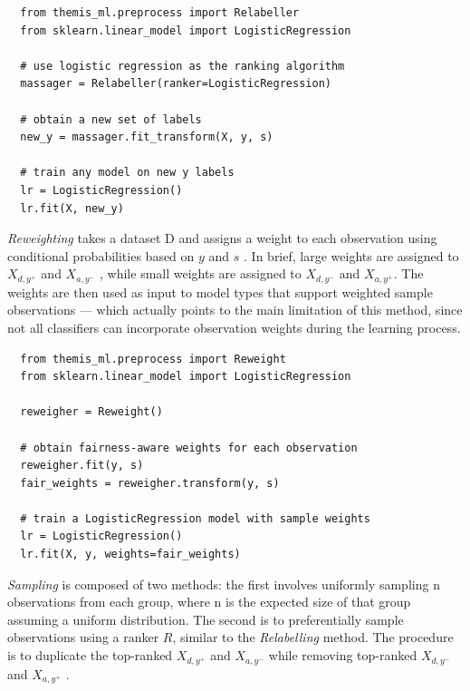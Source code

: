 \documentclass{acm_proc_article-sp}
\begin{document}
\begin{verbatim}
  from themis_ml.preprocess import Relabeller
  from sklearn.linear_model import LogisticRegression

  # use logistic regression as the ranking algorithm
  massager = Relabeller(ranker=LogisticRegression)

  # obtain a new set of labels
  new_y = massager.fit_transform(X, y, s)

  # train any model on new y labels
  lr = LogisticRegression()
  lr.fit(X, new_y)
\end{verbatim}

\emph{Reweighting} takes a dataset D and assigns a weight to each observation
using conditional probabilities based on \(y\) and \(s\) \cite{kamiran2012data}.
In brief, large weights are assigned to \(X_{d, y^{+}}\) and \(X_{a, y^{-}}\) ,
while small weights are assigned to \(X_{d, y^{-}}\) and \(X_{a, y^{+}}\). The
weights are then used as input to model types that support weighted sample
observations --- which actually points to the main limitation of this method,
since not all classifiers can incorporate observation weights during the
learning process.

\begin{verbatim}
  from themis_ml.preprocess import Reweight
  from sklearn.linear_model import LogisticRegression

  reweigher = Reweight()

  # obtain fairness-aware weights for each observation
  reweigher.fit(y, s)
  fair_weights = reweigher.transform(y, s)

  # train a LogisticRegression model with sample weights
  lr = LogisticRegression()
  lr.fit(X, y, weights=fair_weights)
\end{verbatim}

\emph{Sampling} is composed of two methods: the first involves uniformly
sampling n observations from each group, where n is the expected size of that
group assuming a uniform distribution. The second is to preferentially sample
observations using a ranker \(R\), similar to the \emph{Relabelling} method. The
procedure is to duplicate the top-ranked \(X_{d, y^{+}}\) and \(X_{a, y^{-}}\)
while removing top-ranked \(X_{d, y^{-}}\) and \(X_{a, y^{+}}\)
\cite{kamiran2012data}.
\end{document}
